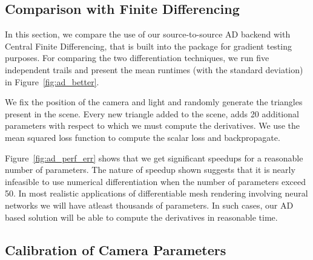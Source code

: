\documentclass{juliacon}
\begin{document}
\subsection{Comparison with Finite Differencing}
\label{sec:finite_diff}

In this section, we compare the use of our source-to-source AD backend with Central Finite Differencing, that is built into the package for gradient testing purposes. For comparing the two differentiation techniques, we run five independent trails and present the mean runtimes (with the standard deviation) in Figure~\ref{fig:ad_better}.

We fix the position of the camera and light and randomly generate the triangles present in the scene. Every new triangle added to the scene, adds 20 additional parameters with respect to which we must compute the derivatives. We use the mean squared loss function to compute the scalar loss and backpropagate.

Figure~\ref{fig:ad_perf_err} shows that we get significant speedups for a reasonable number of parameters. The nature of speedup shown suggests that it is nearly infeasible to use numerical differentiation when the number of parameters exceed 50. In most realistic applications of differentiable mesh rendering involving neural networks we will have atleast thousands of parameters. In such cases, our AD based solution will be able to compute the derivatives in reasonable time.

\subsection{Calibration of Camera Parameters}
\label{sec:calcam}
\end{document}
